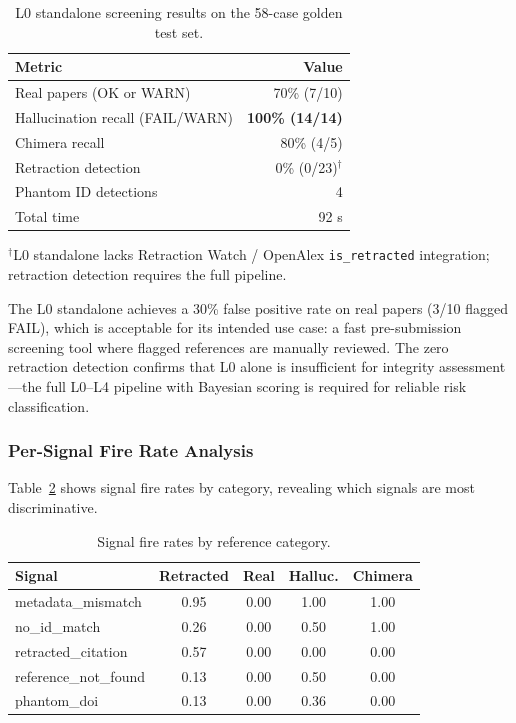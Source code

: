 \documentclass[sigconf,nonacm]{acmart}
\begin{document}
\begin{table}[t]
\caption{L0 standalone screening results on the 58-case golden test set.}
\label{tab:l0standalone}
\centering
\small
\begin{tabular}{lr}
\toprule
\textbf{Metric} & \textbf{Value} \\
\midrule
Real papers (OK or WARN)         & 70\% (7/10) \\
Hallucination recall (FAIL/WARN) & \textbf{100\% (14/14)} \\
Chimera recall                   & 80\% (4/5) \\
Retraction detection             & 0\% (0/23)$^\dagger$ \\
Phantom ID detections            & 4 \\
Total time                       & 92 s \\
\bottomrule
\end{tabular}
\vspace{2pt}
{\footnotesize $^\dagger$L0 standalone lacks Retraction Watch / OpenAlex \texttt{is\_retracted} integration; retraction detection requires the full pipeline.}
\end{table}

\noindent The L0 standalone achieves a 30\% false positive rate on real papers (3/10 flagged FAIL), which is acceptable for its intended use case: a fast pre-submission screening tool where flagged references are manually reviewed.
The zero retraction detection confirms that L0 alone is insufficient for integrity assessment---the full L0--L4 pipeline with Bayesian scoring is required for reliable risk classification.

\subsubsection{Per-Signal Fire Rate Analysis}

Table~\ref{tab:fire_rates} shows signal fire rates by category, revealing which signals are most discriminative.

\begin{table}[t]
\caption{Signal fire rates by reference category.}
\label{tab:fire_rates}
\centering
\small
\begin{tabular}{lcccc}
\toprule
\textbf{Signal} & \textbf{Retracted} & \textbf{Real} & \textbf{Halluc.} & \textbf{Chimera} \\
\midrule
metadata\_mismatch      & 0.95 & 0.00 & 1.00 & 1.00 \\
no\_id\_match           & 0.26 & 0.00 & 0.50 & 1.00 \\
retracted\_citation     & 0.57 & 0.00 & 0.00 & 0.00 \\
reference\_not\_found   & 0.13 & 0.00 & 0.50 & 0.00 \\
phantom\_doi            & 0.13 & 0.00 & 0.36 & 0.00 \\
\bottomrule
\end{tabular}
\end{table}
\end{document}
